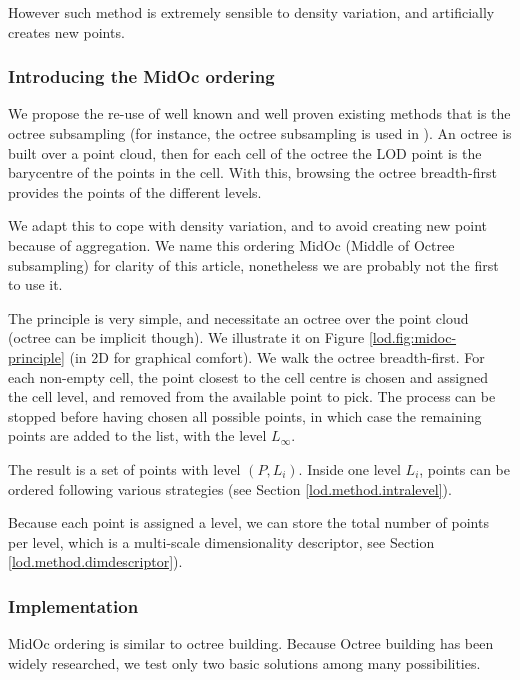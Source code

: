 		However such method is extremely sensible to density variation, and artificially creates new points. 
		
		\subsubsection{Introducing the MidOc ordering}
		
		
		We propose the re-use of well known and well proven existing methods that is the octree subsampling (for instance, the octree subsampling is used in \cite{Girardeau-Montaut2014}).
		An octree is built over a point cloud, then for each cell of the octree the LOD point is the barycentre of the points in the cell.  With this, browsing the octree breadth-first provides the points of the different levels.
		
		We adapt this to cope with density variation, and to avoid creating new point because of aggregation.   
		We name this ordering MidOc (Middle of Octree subsampling) for clarity of this article, nonetheless we are probably not the first to use it.
		
		The principle is very simple, and necessitate an octree over the point cloud (octree can be implicit though).
		We illustrate it on Figure \ref{lod.fig:midoc-principle} (in 2D for graphical comfort).
		We walk the octree breadth-first.
		For each non-empty cell, the point closest to the cell centre is chosen and assigned the cell level,
		and removed from the available point to pick.
		The process can be stopped before having chosen all possible points,
		in which case the remaining points are added to the list, with the level $L_\infty$.
		
		The result is a set of points with level $(P,L_i)$.
		Inside one level $L_i$, points can be ordered following various strategies (see Section \ref{lod.method.intralevel}).
		
		Because each point is assigned a level, we can store the total number of points per level, which is a multi-scale dimensionality descriptor, see Section \ref{lod.method.dimdescriptor}).
		
		\subsubsection{Implementation}
		\label{lod.method.midoc.implementation}
		MidOc ordering is similar to octree building. Because Octree building has been widely researched, we test only two basic solutions among many possibilities.
		
